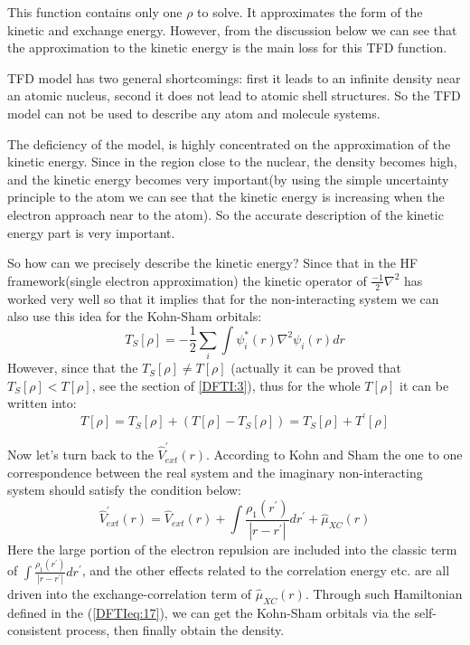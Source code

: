 This function contains only one $\rho$ to solve. It approximates the
form of the kinetic and exchange energy. However, from the
discussion below we can see that the approximation to the kinetic
energy is the main loss for this TFD function.

TFD model has two general shortcomings: first it leads to an
infinite density near an atomic nucleus, second it does not lead to
atomic shell structures. So the TFD model can not be used to
describe any atom and molecule systems.

The deficiency of the model, is highly concentrated on the
approximation of the kinetic energy. Since in the region close to
the nuclear, the density becomes high, and the kinetic energy
becomes very important(by using the simple uncertainty principle to
the atom we can see that the kinetic energy is increasing when the
electron approach near to the atom). So the accurate description of
the kinetic energy part is very important.

So how can we precisely describe the kinetic energy? Since that in
the HF framework(single electron approximation) the kinetic operator
of $\frac{-1}{2}\nabla^{2}$ has worked very well so that it implies
that for the non-interacting system we can also use this idea for
the Kohn-Sham orbitals:
\begin{equation}\label{DFTIeq:26}
  T_{S}[\rho]  = -\frac{1}{2}\sum_{i}\int
  \psi^{*}_{i}(r)\nabla^{2}\psi_{i}(r)
  dr
\end{equation}
However, since that the $T_{S}[\rho] \neq T[\rho]$ (actually it can
be proved that $T_{S}[\rho] < T[\rho]$, see the section of
\ref{DFTI:3}), thus for the whole $T[\rho]$ it can be written into:
\begin{equation}\label{}
  T[\rho] = T_{S}[\rho] + (T[\rho]- T_{S}[\rho]) = T_{S}[\rho] +
  T^{'}[\rho]
\end{equation}

Now let's turn back to the $\hat{V}_{ext}^{'}(r)$. According to Kohn
and Sham\cite{HK2} the one to one correspondence between the real
system and the imaginary non-interacting system should satisfy the
condition below:
\begin{equation}\label{DFTIeq:25}
\hat{V}_{ext}^{'}(r) = \hat{V}_{ext}(r) + \int \frac{\rho_{1}(r^{'})
}{|r-r^{'}|}dr^{'} + \hat{\mu}_{XC}(r)
\end{equation}
Here the large portion of the electron repulsion are included into
the classic term of $\int \frac{\rho_{1}(r^{'}) }{|r-r^{'}|}dr^{'}$,
and the other effects related to the correlation energy etc. are all
driven into the exchange-correlation term of $\hat{\mu}_{XC}(r)$.
Through such Hamiltonian defined in the (\ref{DFTIeq:17}), we can
get the Kohn-Sham orbitals via the self-consistent process, then
finally obtain the density.


